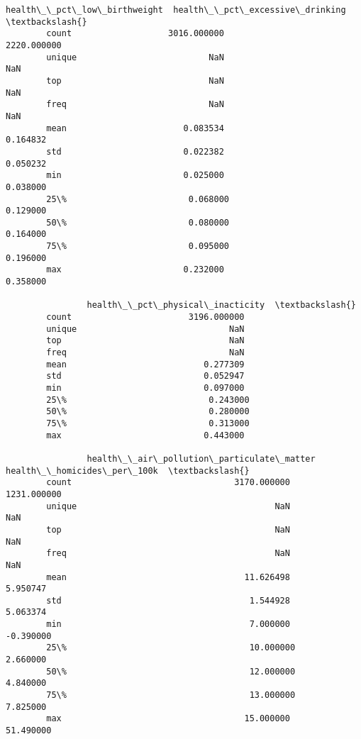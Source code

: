 \documentclass[11pt]{article}
\begin{document}
\begin{Verbatim}[commandchars=\\\{\}]
                health\_\_pct\_low\_birthweight  health\_\_pct\_excessive\_drinking  \textbackslash{}
        count                   3016.000000                     2220.000000   
        unique                          NaN                             NaN   
        top                             NaN                             NaN   
        freq                            NaN                             NaN   
        mean                       0.083534                        0.164832   
        std                        0.022382                        0.050232   
        min                        0.025000                        0.038000   
        25\%                        0.068000                        0.129000   
        50\%                        0.080000                        0.164000   
        75\%                        0.095000                        0.196000   
        max                        0.232000                        0.358000   
        
                health\_\_pct\_physical\_inacticity  \textbackslash{}
        count                       3196.000000   
        unique                              NaN   
        top                                 NaN   
        freq                                NaN   
        mean                           0.277309   
        std                            0.052947   
        min                            0.097000   
        25\%                            0.243000   
        50\%                            0.280000   
        75\%                            0.313000   
        max                            0.443000   
        
                health\_\_air\_pollution\_particulate\_matter  health\_\_homicides\_per\_100k  \textbackslash{}
        count                                3170.000000                 1231.000000   
        unique                                       NaN                         NaN   
        top                                          NaN                         NaN   
        freq                                         NaN                         NaN   
        mean                                   11.626498                    5.950747   
        std                                     1.544928                    5.063374   
        min                                     7.000000                   -0.390000   
        25\%                                    10.000000                    2.660000   
        50\%                                    12.000000                    4.840000   
        75\%                                    13.000000                    7.825000   
        max                                    15.000000                   51.490000   
        

\end{Verbatim}
\end{document}
